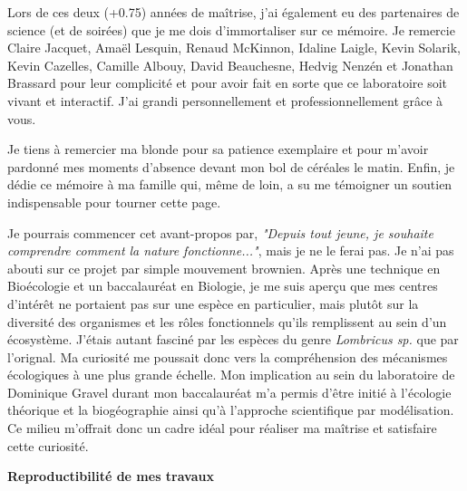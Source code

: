 
Lors de ces deux (+0.75) années de maîtrise, j'ai également eu des partenaires de science (et de
soirées) que je me dois d'immortaliser sur ce mémoire. Je remercie Claire Jacquet, Amaël Lesquin,
Renaud McKinnon, Idaline Laigle, Kevin Solarik, Kevin Cazelles, Camille Albouy, David Beauchesne,
Hedvig Nenzén et Jonathan Brassard pour leur complicité et pour avoir fait en sorte que ce
laboratoire soit vivant et interactif. J'ai grandi personnellement et professionnellement
grâce à vous.

Je tiens à remercier ma blonde pour sa patience exemplaire et pour m'avoir pardonné mes moments
d'absence devant mon bol de céréales le matin. Enfin, je dédie ce mémoire à ma famille qui, même de
loin, a su me témoigner un soutien indispensable pour tourner cette page.


\avantpropos


Je pourrais commencer cet avant-propos par, \textit{"Depuis tout jeune, je souhaite comprendre
comment la nature fonctionne..."}, mais je ne le ferai pas. Je n'ai pas abouti sur ce projet par
simple mouvement brownien. Après une technique en Bioécologie et un baccalauréat en Biologie, je me
suis aperçu que mes centres d'intérêt ne portaient pas sur une espèce en particulier, mais plutôt
sur la diversité des organismes et les rôles fonctionnels qu'ils remplissent au sein d'un
écosystème. J'étais autant fasciné par les espèces du genre \textit{Lombricus sp.} que par
l'orignal. Ma curiosité me poussait donc vers la compréhension des mécanismes écologiques à une plus
grande échelle. Mon implication au sein du laboratoire de Dominique Gravel durant mon baccalauréat
m'a permis d'être initié à l'écologie théorique et la biogéographie ainsi qu'à l'approche
scientifique par modélisation. Ce milieu m'offrait donc un cadre idéal pour réaliser ma
maîtrise et satisfaire cette curiosité.

\noindent\textbf{Reproductibilité de mes travaux}

